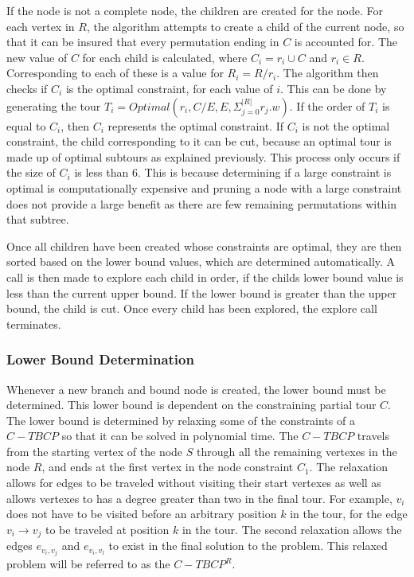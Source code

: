 \documentclass[sigconf, anonymous, pdftex]{acmart}
\begin{document}
If the node is not a complete node, the children are created for the node. For each vertex in $R$, the algorithm attempts to create a child of the current node, so that it can be insured that every permutation ending in $C$ is accounted for. The new value of $C$ for each child is calculated, where $C_i = r_i \cup C$ and $r_i \in R$. Corresponding to each of these is a value for $R_i = R/r_i$. The algorithm then checks if  $C_i$ is the optimal constraint, for each value of $i$. This can be done by generating the tour $T_i = Optimal(r_i, C/E, E, \Sigma_{j=0}^{|R|}r_j.w)$. If the order of $T_i$ is equal to $C_i$, then $C_i$ represents the optimal constraint. If $C_i$ is not the optimal constraint, the child corresponding to it can be cut, because an optimal tour is made up of optimal subtours as explained previously. This process only occurs if the size of $C_i$ is less than $6$. This is because determining if a large constraint is optimal is computationally expensive and pruning a node with a large constraint does not provide a large benefit as there are few remaining permutations within that subtree.

Once all children have been created whose constraints are optimal, they are then sorted based on the lower bound values, which are determined automatically. A call is then made to explore each child in order, if the childs lower bound value is less than the current upper bound. If the lower bound is greater than the upper bound, the child is cut. Once every child has been explored, the explore call terminates. 

\subsubsection{Lower Bound Determination}

Whenever a new branch and bound node is created, the lower bound must be determined. This lower bound is dependent on the constraining partial tour $C$. The lower bound is determined by relaxing some of the constraints of a $C-TBCP$ so that it can be solved in polynomial time. The $C-TBCP$ travels from the starting vertex of the node $S$ through all the remaining vertexes in the node $R$, and ends at the first vertex in the node constraint $C_1$. The relaxation allows for edges to be traveled without visiting their start vertexes as well as allows vertexes to has a degree greater than two in the final tour. For example, $v_i$ does not have to be visited before an arbitrary position $k$ in the tour, for the edge $v_i \rightarrow v_j$ to be traveled at position $k$ in the tour. The second relaxation allows the edges $e_{v_i, v_j}$ and $e_{v_i, v_l}$ to exist in the final solution to the problem. This relaxed problem will be referred to as the $C-TBCP^R$.
\end{document}
